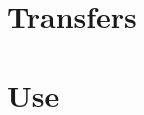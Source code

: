 \documentclass[12pt]{book}
\begin{document}




\part{Transfers}











%
%




\part{Use}










\end{document}
